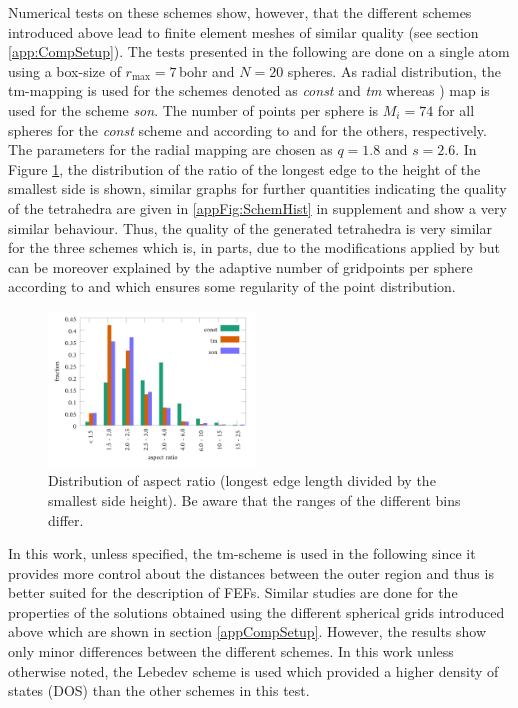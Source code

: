 Numerical tests on these schemes show, however, that the different schemes introduced above lead to finite element meshes of similar quality (see section \ref{app:CompSetup}).
The tests presented in the following are done on a single atom using a box-size of $r_\text{max}=7\,$bohr and $N=20$ spheres.
As radial distribution, the tm-mapping  is used for the schemes denoted as \textit{const} and \textit{tm} whereas ) map is used for the scheme \textit{son}.
The number of points per sphere is $M_i=74$ for all spheres for the \textit{const} scheme and according to  and  for the others, respectively.
The parameters for the radial mapping are chosen as $q=1.8$ and $s=2.6$.
In Figure \ref{fig:SchemHist}, the distribution of the ratio of the longest edge to the height of the smallest side is shown, similar graphs for further quantities indicating the quality of the tetrahedra are given in \ref{appFig:SchemHist} in supplement and show a very similar behaviour.
Thus, the quality of the generated tetrahedra is very similar for the three schemes which is, in parts, due to the modifications applied by  but can be moreover explained by the adaptive number of gridpoints per sphere according to  and  which ensures some regularity of the point distribution.
\begin{figure}
\includegraphics[width=0.49\textwidth]{Figures/Radi_hist.pdf}
\caption{Distribution of aspect ratio (longest edge length divided by the smallest side height).
   Be aware that the ranges of the different bins differ.}
\label{fig:SchemHist}
\end{figure}
In this work, unless specified, the tm-scheme is used in the following since it provides more control about the distances between the outer region and thus is better suited for the description of FEFs.
Similar studies are done for the properties of the solutions obtained using the different spherical grids introduced above which are shown in section \ref{appCompSetup}.
However, the results show only minor differences between the different schemes.
In this work unless otherwise noted, the Lebedev scheme is used which provided a higher density of states (DOS) than the other schemes in this test.
